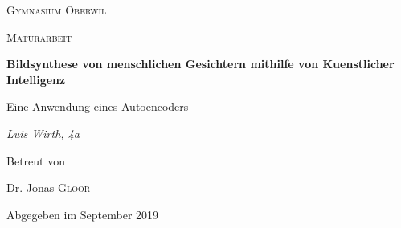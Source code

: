\documentclass[../main]{subfiles}
\begin{document}
\begin{titlepage}
    \centering
    
    {\scshape\LARGE Gymnasium Oberwil\par}
    \vspace{1cm}
    {\scshape\Large Maturarbeit\par}
    \vspace{1.5cm}
    {\huge\bfseries Bildsynthese von menschlichen Gesichtern mithilfe von Kuenstlicher Intelligenz\par}
    \vspace{0.2cm}
    {Eine Anwendung eines Autoencoders\par}
    \vspace{2cm}
    {\Large\itshape Luis Wirth, 4a\par}
    \vfill
    Betreut von\par
    Dr. Jonas \textsc{Gloor}
    
    \vfill
    {\large Abgegeben im September 2019\par}
\end{titlepage}
\end{document}
